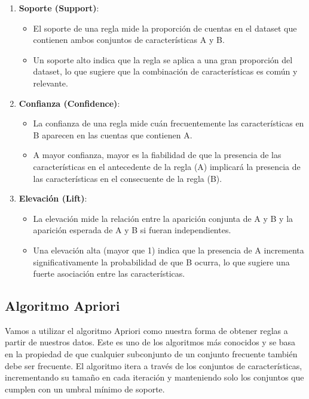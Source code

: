 \documentclass[
  letterpaper,
  DIV=11,
  numbers=noendperiod]{scrreprt}
\begin{document}
\begin{enumerate}
\def\labelenumi{\arabic{enumi}.}
\item
  \textbf{Soporte (Support)}:

  \begin{itemize}
  \item
    El soporte de una regla mide la proporción de cuentas en el dataset
    que contienen ambos conjuntos de características A y B.
  \item
    Un soporte alto indica que la regla se aplica a una gran proporción
    del dataset, lo que sugiere que la combinación de características es
    común y relevante.
  \end{itemize}
\item
  \textbf{Confianza (Confidence)}:

  \begin{itemize}
  \item
    La confianza de una regla mide cuán frecuentemente las
    características en B aparecen en las cuentas que contienen A.
  \item
    A mayor confianza, mayor es la fiabilidad de que la presencia de las
    características en el antecedente de la regla (A) implicará la
    presencia de las características en el consecuente de la regla (B).
  \end{itemize}
\item
  \textbf{Elevación (Lift)}:

  \begin{itemize}
  \item
    La elevación mide la relación entre la aparición conjunta de A y B y
    la aparición esperada de A y B si fueran independientes.
  \item
    Una elevación alta (mayor que 1) indica que la presencia de A
    incrementa significativamente la probabilidad de que B ocurra, lo
    que sugiere una fuerte asociación entre las características.
  \end{itemize}
\end{enumerate}

\subsection{Algoritmo Apriori}\label{algoritmo-apriori}

Vamos a utilizar el algoritmo Apriori como nuestra forma de obtener
reglas a partir de nuestros datos. Este es uno de los algoritmos más
conocidos y se basa en la propiedad de que cualquier subconjunto de un
conjunto frecuente también debe ser frecuente. El algoritmo itera a
través de los conjuntos de características, incrementando su tamaño en
cada iteración y manteniendo solo los conjuntos que cumplen con un
umbral mínimo de soporte.
\end{document}
